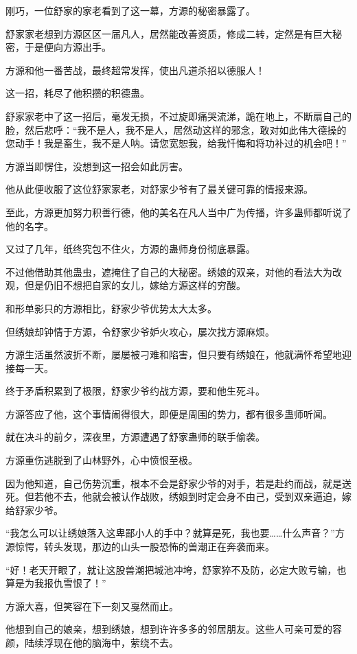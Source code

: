 \begin{this_body}
刚巧，一位舒家的家老看到了这一幕，方源的秘密暴露了。

舒家家老想到方源区区一届凡人，居然能改善资质，修成二转，定然是有巨大秘密，于是便向方源出手。

方源和他一番苦战，最终超常发挥，使出凡道杀招以德服人！

这一招，耗尽了他积攒的积德蛊。

舒家家老中了这一招后，毫发无损，不过旋即痛哭流涕，跪在地上，不断扇自己的脸，然后悲呼：“我不是人，我不是人，居然动这样的邪念，敢对如此伟大德操的您动手！我是畜生，我不是人呐。请您宽恕我，给我忏悔和将功补过的机会吧！”

方源当即愣住，没想到这一招会如此厉害。

他从此便收服了这位舒家家老，对舒家少爷有了最关键可靠的情报来源。

至此，方源更加努力积善行德，他的美名在凡人当中广为传播，许多蛊师都听说了他的名字。

又过了几年，纸终究包不住火，方源的蛊师身份彻底暴露。

不过他借助其他蛊虫，遮掩住了自己的大秘密。绣娘的双亲，对他的看法大为改观，但是仍旧不想把自家的女儿，嫁给方源这样的穷酸。

和形单影只的方源相比，舒家少爷优势太大太多。

但绣娘却钟情于方源，令舒家少爷妒火攻心，屡次找方源麻烦。

方源生活虽然波折不断，屡屡被刁难和陷害，但只要有绣娘在，他就满怀希望地迎接每一天。

终于矛盾积累到了极限，舒家少爷约战方源，要和他生死斗。

方源答应了他，这个事情闹得很大，即便是周围的势力，都有很多蛊师听闻。

就在决斗的前夕，深夜里，方源遭遇了舒家蛊师的联手偷袭。

方源重伤逃脱到了山林野外，心中愤恨至极。

因为他知道，自己伤势沉重，根本不会是舒家少爷的对手，若是赴约而战，就是送死。但若他不去，他就会被认作战败，绣娘到时定会身不由己，受到双亲逼迫，嫁给舒家少爷。

“我怎么可以让绣娘落入这卑鄙小人的手中？就算是死，我也要……什么声音？”方源惊愕，转头发现，那边的山头一股恐怖的兽潮正在奔袭而来。

“好！老天开眼了，就让这股兽潮把城池冲垮，舒家猝不及防，必定大败亏输，也算是为我报仇雪恨了！”

方源大喜，但笑容在下一刻又戛然而止。

他想到自己的娘亲，想到绣娘，想到许许多多的邻居朋友。这些人可亲可爱的容颜，陆续浮现在他的脑海中，萦绕不去。


\end{this_body}
